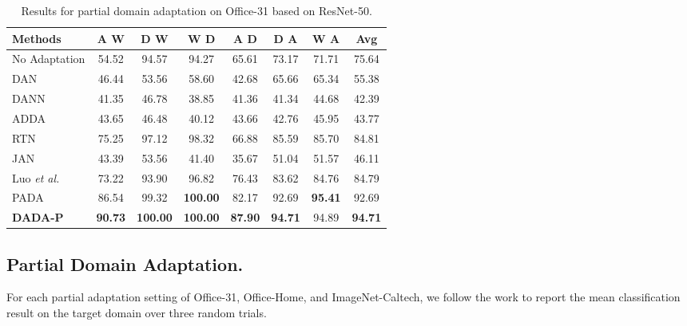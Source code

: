 \documentclass[letterpaper]{article} \usepackage{aaai20}  \usepackage{times}  \usepackage{helvet} \usepackage{courier}  \usepackage[hyphens]{url}  \usepackage{graphicx} \urlstyle{rm} \def\UrlFont{\rm}  \usepackage{graphicx}  \frenchspacing  \setlength{\pdfpagewidth}{8.5in}  \setlength{\pdfpageheight}{11in}
\begin{document}
\begin{table*}[!htb]
	\begin{center}
		\caption{Results for partial domain adaptation on Office-31 based on ResNet-50.}
		\label{table:results_office31_partial_transfer}
		\begin{tabular}{lccccccc}
			\hline
			Methods  & A  W & D  W & W  D & A  D & D  A & W  A & Avg \\
			\hline
			No Adaptation \cite{resnet} & 54.52 & 94.57 & 94.27 & 65.61 & 73.17 & 71.71 & 75.64 \\ 
			
			DAN \cite{dan}       & 46.44 & 53.56 & 58.60 & 42.68 & 65.66 & 65.34 & 55.38 \\ 
			
			DANN \cite{dann}     & 41.35 & 46.78 & 38.85 & 41.36 & 41.34 & 44.68 & 42.39 \\ 
			
			ADDA \cite{adda}     & 43.65 & 46.48 & 40.12 & 43.66 & 42.76 & 45.95 & 43.77 \\ 
			
			RTN \cite{rtn}       & 75.25 & 97.12 & 98.32 & 66.88 & 85.59 & 85.70 & 84.81 \\ 
			
			JAN \cite{jan}       & 43.39 & 53.56 & 41.40 & 35.67 & 51.04 & 51.57 & 46.11 \\ 
			
			Luo \emph{et al.} \cite{lel}   & 73.22 & 93.90 & 96.82 & 76.43 & 83.62 & 84.76 & 84.79 \\ 
			
			PADA \cite{pada}     & 86.54 & 99.32 & \textbf{100.00} & 82.17 & 92.69 & \textbf{95.41} & 92.69 \\ 
			\hline
			\textbf{DADA-P}    & \textbf{90.73} & \textbf{100.00} & \textbf{100.00} & \textbf{87.90} & \textbf{94.71} & 94.89 & \textbf{94.71} \\ 
			\hline
		\end{tabular}
	\end{center}
\end{table*}

\subsection{Partial Domain Adaptation. }

For each partial adaptation setting of Office-31, Office-Home, and ImageNet-Caltech, we follow the work \cite{pada} to report the mean classification result on the target domain over three random trials.
\end{document}
